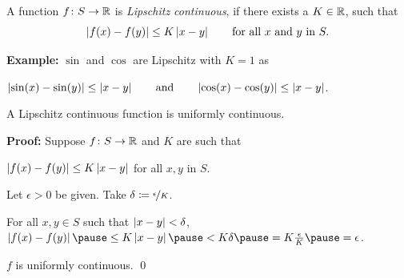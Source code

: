 \documentclass[10pt,aspectratio=149]{beamer}
\begin{document}
\begin{frame}

\begin{definition}
A function $f \colon S \to {\mathbb{R}}$
is \emph{Lipschitz continuous}, if there exists a $K \in {\mathbb{R}}$, such that
\begin{equation*}
\left\lvert {f(x)-f(y)} \right\rvert \leq K \left\lvert {x-y} \right\rvert 
\qquad \text{for all } x \text{ and } y \text{ in } S.
\end{equation*}
\end{definition}

\pause
\textbf{Example:} $\sin$ and $\cos$ are Lipschitz with $K=1$ as

$\left\lvert {\sin(x)-\sin(y)} \right\rvert \leq \left\lvert {x-y} \right\rvert \qquad \text{and} \qquad
\left\lvert {\cos(x)-\cos(y)} \right\rvert \leq \left\lvert {x-y} \right\rvert$.


\pause
\begin{proposition}
A Lipschitz continuous function is uniformly continuous.
\end{proposition}

\pause
\textbf{Proof:}
Suppose $f \colon S \to {\mathbb{R}}$ and $K$ are such that

$\left\lvert {f(x)-f(y)} \right\rvert \leq K \left\lvert {x-y} \right\rvert$ for all $x, y$ in $S$.

\pause
\medskip

Let $\epsilon > 0$ be given.
\pause
\quad
Take $\delta \coloneqq \nicefrac{\epsilon}{K}$.

\pause
\medskip

For all $x,y \in S$ such that
$\left\lvert {x-y} \right\rvert < \delta$,
\pause
\quad
$\abs{f(x)-f(y)}
\pause
\leq K \abs{x-y}
\pause
< K \delta
\pause
= K \frac{\epsilon}{K}
\pause
=
\epsilon$.

\pause
\medskip

\thus \quad $f$ is uniformly continuous.
\qed

\end{frame}
\end{document}
